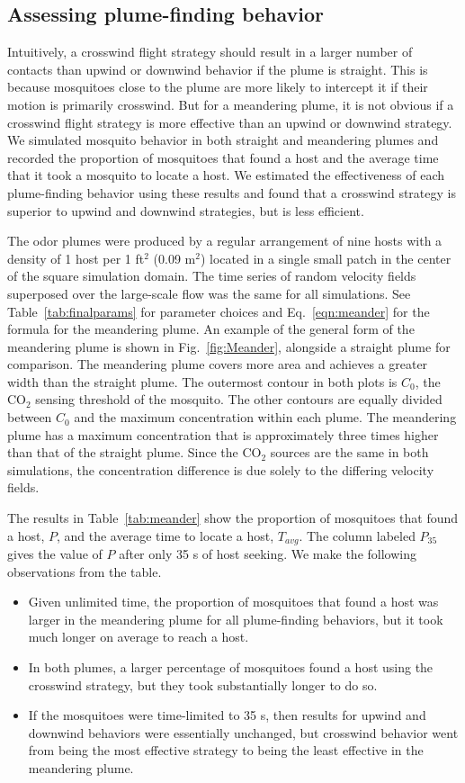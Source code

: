 \documentclass[10pt]{article}
\begin{document}
		\subsection*{Assessing plume-finding behavior}\label{sec:res:meander}
			Intuitively, a crosswind flight strategy should result in a larger number of contacts than upwind or downwind behavior if the plume is straight. This is because mosquitoes close to the plume are more likely to intercept it if their motion is primarily crosswind. But for a meandering plume, it is not obvious if a crosswind flight strategy is more effective than an upwind or downwind strategy. We simulated mosquito behavior in both straight and meandering plumes and recorded the proportion of mosquitoes that found a host and the average time that it took a mosquito to locate a host. We estimated the effectiveness of each plume-finding behavior using these results and found that a crosswind strategy is superior to upwind and downwind strategies, but is less efficient.
			
			
			The odor plumes were produced by a regular arrangement of nine hosts with a density of 1 host per 1 ft$^2$ (0.09 m$^2$) located in a single small patch in the center of the square simulation domain. The time series of random velocity fields superposed over the large-scale flow was the same for all simulations. See Table~\ref{tab:finalparams} for parameter choices and Eq.~\eqref{eqn:meander} for the formula for the meandering plume. An example of the general form of the meandering plume is shown in Fig.~\ref{fig:Meander}, alongside a straight plume for comparison. The meandering plume covers more area and achieves a greater width than the straight plume. The outermost contour in both plots is $C_0$, the CO$_2$ sensing threshold of the mosquito. The other contours are equally divided between $C_0$ and the maximum concentration within each plume. The meandering plume has a maximum concentration that is approximately three times higher than that of the straight plume. Since the CO$_2$ sources are the same in both simulations, the concentration difference is due solely to the differing velocity fields.

				The results in Table~\ref{tab:meander} show the proportion of mosquitoes that found a host, $P$, and the average time to locate a host, $T_{avg}$. The column labeled $P_{35}$ gives the value of $P$ after only 35 s of host seeking. We make the following observations from the table.
		\begin{itemize}
			\item Given unlimited time, the proportion of mosquitoes that found a host was larger in the meandering plume for all plume-finding behaviors, but it took much longer on average to reach a host.
			\item In both plumes, a larger percentage of mosquitoes found a host using the crosswind strategy, but they took substantially longer to do so. 
			\item If the mosquitoes were time-limited to 35 s, then results for upwind and downwind behaviors were essentially unchanged, but crosswind behavior went from being the most effective strategy to being the least effective in the meandering plume.
		\end{itemize}
			
\end{document}
